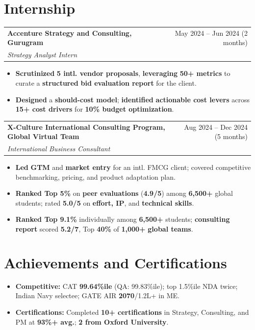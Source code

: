 \documentclass[a4paper,10pt]{article}
\makeatletter
\newcommand{\role}[4]{%
  \vspace{1pt}%
  \begin{tabular*}{\textwidth}{l@{\extracolsep{\fill}}r}
    \textbf{\small #1} & \small #2 \\
    \textit{\small #3} & \textit{\small #4} \\
  \end{tabular*}\vspace{0pt}%
}
\newcommand{\blist}{\begin{itemize}[leftmargin=0.15in, label={--}, itemsep=-1pt, topsep=3pt, parsep=0pt]}
\newcommand{\elistb}{\end{itemize}\vspace{0pt}}
\makeatother
\begin{document}
\section{Internship}
\vspace{0pt}

\role{Accenture Strategy and Consulting, Gurugram}{May 2024 -- Jun 2024 (2 months)}{Strategy Analyst Intern}{}
\blist
  \item \small \textbf{Scrutinized} \textbf{5 intl. vendor proposals}, \textbf{leveraging} \textbf{50+ metrics} to curate a \textbf{structured} \textbf{bid evaluation report} for the client.
  \item \small \textbf{Designed} a \textbf{should-cost model}; \textbf{identified} \textbf{actionable cost levers} across \textbf{15+ cost drivers} for \textbf{10\% budget optimization}.
\elistb

\role{X-Culture International Consulting Program, Global Virtual Team}{Aug 2024 -- Dec 2024 (5 months)}{International Business Consultant}{}
\blist
  \item \small \textbf{Led} \textbf{GTM} and \textbf{market entry} for an intl. FMCG client; covered competitive benchmarking, pricing, and product adaptation plan.
  \item \small \textbf{Ranked Top 5\%} on \textbf{peer evaluations} (\textbf{4.9/5}) among \textbf{6,500+} global students; rated \textbf{5.0/5} on \textbf{effort, IP}, and \textbf{technical skills}.
  \item \small \textbf{Ranked Top 9.1\%} individually among \textbf{6,500+} students; \textbf{consulting report} scored \textbf{5.2/7}, Top \textbf{40\%} of \textbf{1,000+} \textbf{global teams}.
\elistb

\section{Achievements and Certifications}
\vspace{0pt}
\begin{itemize}[leftmargin=0in, label={}, itemsep=0pt, topsep=0pt]
  \item \small \textbf{Competitive:} CAT \textbf{99.64\%ile} (QA: 99.83\%ile); top 1.5\%ile NDA twice; Indian Navy selectee; GATE AIR \textbf{2070}/1.2L+ in ME.
  \item \small \textbf{Certifications:} Completed \textbf{10+ certifications} in Strategy, Consulting, and PM at \textbf{93\%+ avg.}; \textbf{2 from Oxford University}.
\end{itemize}
\end{document}
